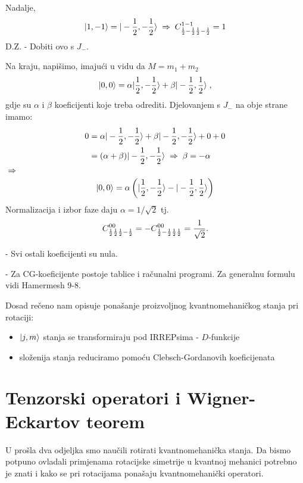 Nadalje,
\begin{displaymath}
    | 1, -1 \rangle = | -\frac{1}{2}, -\frac{1}{2} \rangle \;\Rightarrow\;
C^{1 -1}_{\frac{1}{2} -\frac{1}{2} \frac{1}{2} -\frac{1}{2}}= 1
\end{displaymath}
D.Z. - Dobiti ovo s $J_-$.

Na kraju, napišimo, imajući u vidu da $M=m_1+m_2$
\begin{displaymath}
 | 0,0 \rangle = \alpha| \frac{1}{2}, -\frac{1}{2} \rangle+\beta| -\frac{1}{2}, \frac{1}{2} \rangle \;,
\end{displaymath}
gdje su $\alpha$ i $\beta$  koeficijenti koje treba odrediti.
Djelovanjem s $J_-$ na obje strane imamo:
\begin{equation}
\begin{split}
0 &= \alpha| -\frac{1}{2}, -\frac{1}{2} \rangle + \beta| -\frac{1}{2}, -\frac{1}{2} \rangle + 0 + 0\\
&= (\alpha+\beta)| -\frac{1}{2}, -\frac{1}{2} \rangle \;\Rightarrow\; \beta=-\alpha
\end{split}
\end{equation}
$\;\Rightarrow\;$
\begin{displaymath}
   | 0,0 \rangle=\alpha\left(| \frac{1}{2}, -\frac{1}{2} \rangle-| -\frac{1}{2}, \frac{1}{2} \rangle
\right)
\end{displaymath}
Normalizacija i izbor faze daju $\alpha=1/\sqrt{2}$ tj.
\begin{displaymath}
 C^{0 0}_{\frac{1}{2} \frac{1}{2} \frac{1}{2} -\frac{1}{2}}=
 -C^{0 0}_{\frac{1}{2} -\frac{1}{2} \frac{1}{2} \frac{1}{2}}= \frac{1}{\sqrt{2}}.
\end{displaymath}

- Svi ostali koeficijenti su nula.

- Za CG-koeficijente postoje tablice i računalni programi. Za
  generalnu formulu vidi Hamermesh 9-8.

Dosad rečeno nam opisuje ponašanje proizvoljnog kvantnomehaničkog
stanja pri rotaciji:
\begin{itemize}
\item $| j, m \rangle$ stanja se transformiraju pod IRREPsima - $D$-funkcije
\item složenija stanja reduciramo pomoću Clebsch-Gordanovih koeficijenata
\end{itemize}


\section{Tenzorski operatori i Wigner-Eckartov teorem}
\label{sect:tenzorskioperatori}

U prošla dva odjeljka smo naučili rotirati kvantnomehanička stanja.
Da bismo potpuno ovladali primjenama rotacijske simetrije u
kvantnoj mehanici
potrebno je znati i kako se pri rotacijama ponašaju kvantnomehanički
operatori.


